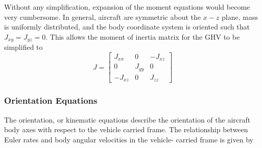 Without any simplification, expansion of the moment equations would become very cumbersome.
In general, aircraft are symmetric about the $x-z$ plane, mass is uniformly distributed, and the body coordinate system is oriented such that $J_{xy}=J_{yz}=0$.
This allows the moment of inertia matrix for the GHV to be simplified to
\begin{equation*}
  J=
  \begin{bmatrix}
    J_{xx} & 0 & -J_{xz} \\
    0 & J_{yy} & 0 \\
    -J_{xz} & 0 & J_{zz}
  \end{bmatrix}
\end{equation*}

\subsubsection{Orientation Equations}

The orientation, or kinematic equations describe the orientation of the aircraft body axes with respect to the vehicle carried frame.
The relationship between Euler rates and body angular velocities in the vehicle- carried frame is given by

